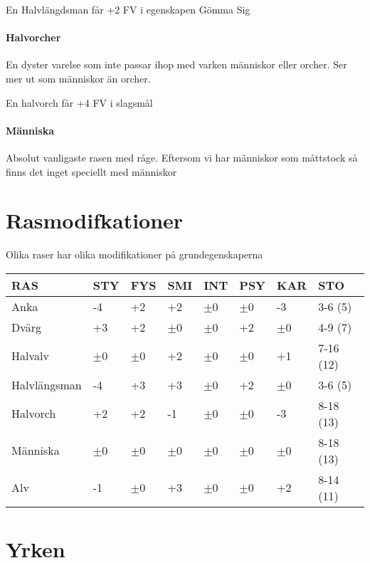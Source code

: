 \documentclass[a4paper, 10pt, titlepage]{article}
\begin{document}
En Halvlängdsman får +2 FV i egenskapen Gömma Sig

\paragraph{Halvorcher} En dyster varelse som inte passar ihop med varken människor eller orcher.
Ser mer ut som människor än orcher.

En halvorch får +4 FV i slagsmål

\paragraph{Människa} Absolut vanligaste rasen med råge. Eftersom vi har människor som måttstock
så finns det inget speciellt med människor

\newpage
\section{Rasmodifkationer}
Olika raser har olika modifikationer på grundegenskaperna
\begin{table}[hbp]
  \begin{tabular}{|l|l|l|l|l|l|l|l|}
    \hline
    RAS           & STY     & FYS      & SMI     & INT    & PSY     & KAR     & STO       \\
    \hline
    Anka          & -4      & +2       & +2      & $\pm$0 & $\pm$0  & -3      & 3-6 (5)   \\
    \hline
    Dvärg         & +3      & +2       & $\pm$0  & $\pm$0 & +2      & $\pm$0  & 4-9 (7)   \\
    \hline
    Halvalv       & $\pm$0  & $\pm$0   & +2      & $\pm$0 & $\pm$0  & +1      & 7-16 (12) \\
    \hline
    Halvlängsman  & -4      & +3       & +3      & $\pm$0 & +2      & $\pm$0  & 3-6 (5)   \\
    \hline
    Halvorch      & +2      & +2       & -1      & $\pm$0 & $\pm$0  & -3      & 8-18 (13) \\
    \hline
    Människa      & $\pm$0  & $\pm$0   & $\pm$0  & $\pm$0 & $\pm$0  & $\pm$0  & 8-18 (13) \\
    \hline
    Alv           & -1      & $\pm$0   & +3      & $\pm$0 & $\pm$0  & +2      & 8-14 (11) \\
    \hline
  \end{tabular}
\end{table}

\section{Yrken}
\end{document}
